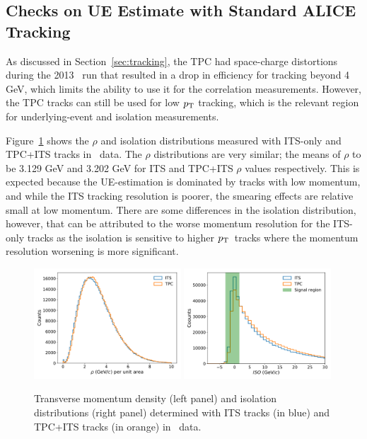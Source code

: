 \subsection{Checks on UE Estimate with Standard ALICE Tracking}
As discussed in Section~\ref{sec:tracking}, the TPC had space-charge distortions during the 2013 \pPb~run that resulted in a drop in efficiency for tracking beyond 4 GeV, which limits the ability to use it for the correlation measurements. However, the TPC tracks can still be used for low $p_{\mathrm{T}}$ tracking, which is the relevant region for underlying-event and isolation measurements. 

Figure~\ref{fig:pPb_its_tpc_rho} shows the $\rho$  and isolation distributions measured with ITS-only and TPC+ITS tracks in \pPb~data. The $\rho$ distributions are very similar; the means of $\rho$ to be 3.129 GeV and 3.202 GeV for ITS and TPC+ITS $\rho$ values respectively. This is expected because the UE-estimation is dominated by tracks with low momentum, and while the ITS tracking resolution is poorer, the smearing effects are relative small at low momentum. There are some differences in the isolation distribution, however, that can be attributed to the worse momentum resolution for the ITS-only tracks as the isolation is sensitive to higher $p_{\mathrm{T}}$~tracks where the momentum resolution worsening is more significant. 

\begin{figure}[hbtp]
	\center
	\includegraphics[width=0.49\textwidth]{Checks_Systematics/UEestimate_Skimmed_13def.pdf}
		\includegraphics[width=0.49\textwidth]{Checks_Systematics/IsolationTPC_Skimmed_13def.pdf}
	\caption{Transverse momentum density (left panel) and isolation distributions (right panel) determined with ITS tracks (in blue) and TPC+ITS tracks (in orange) in \pPb~data.}
	\label{fig:pPb_its_tpc_rho}
\end{figure}

